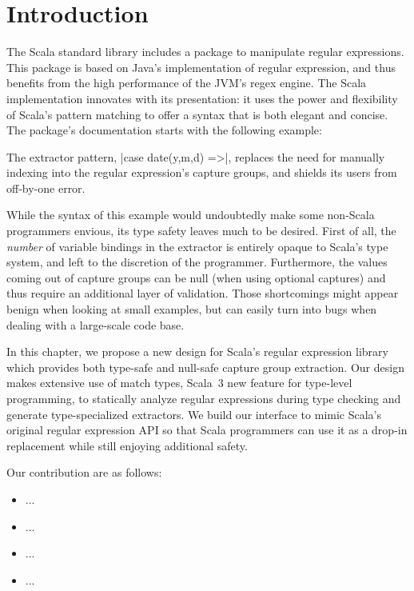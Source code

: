 \section{Introduction}

The Scala standard library includes a package to manipulate regular expressions.
This package is based on Java's implementation of regular expression, and thus benefits from the high performance of the JVM's regex engine.
The Scala implementation innovates with its presentation: it uses the power and flexibility of Scala's pattern matching to offer a syntax that is both elegant and concise.
The package's documentation starts with the following example:


\noindent
The extractor pattern, |case date(y,m,d) =>|, replaces the need for manually indexing into the regular expression's capture groups, and shields its users from off-by-one error.

While the syntax of this example would undoubtedly make some non-Scala programmers envious, its type safety leaves much to be desired.
First of all, the \emph{number} of variable bindings in the extractor is entirely opaque to Scala's type system, and left to the discretion of the programmer.
Furthermore, the values coming out of capture groups can be null (when using optional captures) and thus require an additional layer of validation.
Those shortcomings might appear benign when looking at small examples, but can easily turn into bugs when dealing with a large-scale code base.

In this chapter, we propose a new design for Scala's regular expression library which provides both type-safe and null-safe capture group extraction.
Our design makes extensive use of match types, Scala~3 new feature for type-level programming, to statically analyze regular expressions during type checking and generate type-specialized extractors.
We build our interface to mimic Scala's original regular expression API so that Scala programmers can use it as a drop-in replacement while still enjoying additional safety.

Our contribution are as follows:

\begin{itemize}
  \item ...
  \item ...
  \item ...
  \item ...
\end{itemize}

